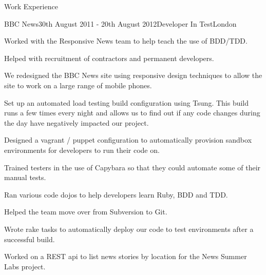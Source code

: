 \documentclass{resume}
\begin{document}
\begin{rSection}{Work Experience}
    \begin{rSubsection}{BBC News}{30th August 2011 - 20th August 2012}{Developer In Test}{London}
      \item Worked with the Responsive News team to help teach the use of BDD/TDD.
      \item Helped with recruitment of contractors and permanent developers.
      \item We redesigned the BBC News site using responsive design techniques to allow the site to work on a large range of mobile phones.
      \item Set up an automated load testing build configuration using Tsung. This build runs a few times every night and allows us to find out if any code changes during the day have negatively impacted our project.
      \item Designed a vagrant / puppet configuration to automatically provision sandbox environments for developers to run their code on.
      \item Trained testers in the use of Capybara so that they could automate some of their manual tests.
      \item Ran various code dojos to help developers learn Ruby, BDD and TDD.
      \item Helped the team move over from Subversion to Git.
      \item Wrote rake tasks to automatically deploy our code to test environments after a successful build.
      \item Worked on a REST api to list news stories by location for the News Summer Labs project.
    \end{rSubsection}


\end{rSection}
\end{document}
